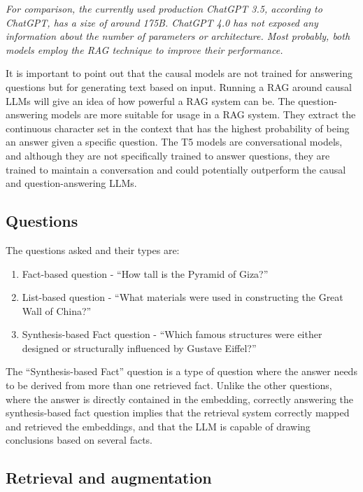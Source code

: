 \documentclass{wseas}
\begin{document}
\emph{For comparison, the currently used production ChatGPT 3.5,
according to ChatGPT, has a size of around 175B. ChatGPT 4.0 has not
exposed any information about the number of parameters or architecture.
Most probably, both models employ the RAG technique to improve their
performance.}

It is important to point out that the causal models are not trained for
answering questions but for generating text based on input. Running a
RAG around causal LLMs will give an idea of how powerful a RAG system
can be. The question-answering models are more suitable for usage in a
RAG system. They extract the continuous character set in the context
that has the highest probability of being an answer given a specific
question. The T5 models are conversational models, and although they are
not specifically trained to answer questions, they are trained to
maintain a conversation and could potentially outperform the causal and
question-answering LLMs.

\subsection{Questions}

The questions asked and their types are:

\begin{enumerate}
\def\labelenumi{\arabic{enumi}.}
\item
  Fact-based question - ``How tall is the Pyramid of Giza?''
\item
  List-based question - ``What materials were used in constructing the
  Great Wall of China?''
\item
  Synthesis-based Fact question - ``Which famous structures were either
  designed or structurally influenced by Gustave Eiffel?''
\end{enumerate}

The ``Synthesis-based Fact'' question is a type of question where the
answer needs to be derived from more than one retrieved fact. Unlike the
other questions, where the answer is directly contained in the
embedding, correctly answering the synthesis-based fact question implies
that the retrieval system correctly mapped and retrieved the embeddings,
and that the LLM is capable of drawing conclusions based on several
facts.


\subsection{Retrieval and
augmentation}
\end{document}
